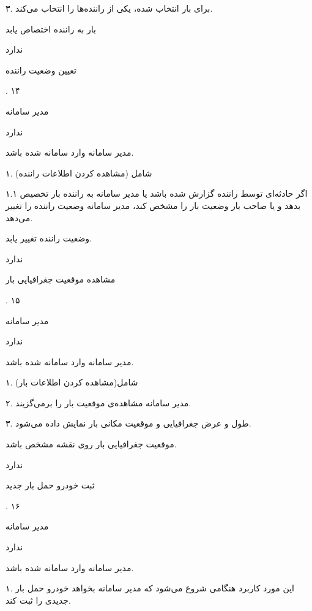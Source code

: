۳. برای بار انتخاب شده، یکی از راننده‌ها را انتخاب می‌کند.

بار به راننده اختصاص یابد

ندارد

\newpage

تعیین وضعیت راننده

.
۱۴

مدیر سامانه

ندارد

مدیر سامانه وارد سامانه شده باشد.


۱. شامل (مشاهده کردن اطلاعات راننده)

۱.۱ اگر حادثه‌ای توسط راننده گزارش شده باشد یا مدیر سامانه به راننده بار تخصیص بدهد و یا صاحب بار وضعیت بار را مشخص کند، مدیر سامانه وضعیت راننده را تغییر می‌دهد.

وضعیت راننده تغییر یابد.

ندارد


\newpage

مشاهده موقعیت جغرافیایی بار

.
۱۵

مدیر سامانه

ندارد

مدیر سامانه وارد سامانه شده باشد.


۱. شامل(مشاهده کردن اطلاعات بار)

۲. مدیر سامانه مشاهده‌ی موقعیت بار را برمی‌گزیند.

۳. طول و عرض جغرافیایی و موقعیت مکانی بار نمایش داده می‌شود.

موقعیت جغرافیایی بار روی نقشه مشخص باشد.

ندارد

\newpage

ثبت خودرو حمل بار جدید

.
۱۶

مدیر سامانه

ندارد

مدیر سامانه وارد سامانه شده باشد.


۱. این مورد کاربرد هنگامی شروع می‌شود که مدیر سامانه بخواهد خودرو حمل بار جدیدی را ثبت کند.

